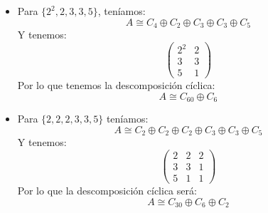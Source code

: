 \begin{ejemplo}
\begin{itemize}
\begin{equation*}
\begin{array}{ccc}
                    5 & 1  
                \end{array}\right)
            \end{equation*}
            La descomposición cíclica será:
            \begin{equation*}
                A\cong C_{120} \oplus C_3
            \end{equation*}
        \item Para $\{2^2,2,3,3,5\}$, teníamos:
            \begin{equation*}
                A\cong C_4\oplus C_2\oplus C_3 \oplus C_3 \oplus C_5
            \end{equation*}
            Y tenemos:
            \begin{equation*}
                \left(\begin{array}{ccc}
                    2^2 & 2 \\
                    3 & 3 \\
                    5 & 1  
                \end{array}\right)
            \end{equation*}
            Por lo que tenemos la descomposición cíclica:
            \begin{equation*}
                A\cong C_{60} \oplus C_6
            \end{equation*}
        \item Para $\{2, 2, 2, 3, 3, 5\}$ teníamos:
            \begin{equation*}
                A\cong C_2\oplus C_2\oplus C_2\oplus C_3\oplus C_3\oplus C_5
            \end{equation*}
            Y tenemos:
            \begin{equation*}
                \left(\begin{array}{ccc}
                    2 & 2 & 2 \\
                    3 & 3 & 1 \\
                    5 & 1 & 1
                \end{array}\right)
            \end{equation*}
            Por lo que la descomposición cíclica será:
            \begin{equation*}
                A\cong C_{30} \oplus C_6 \oplus C_2
            \end{equation*}
    \end{itemize}
\end{ejemplo}


